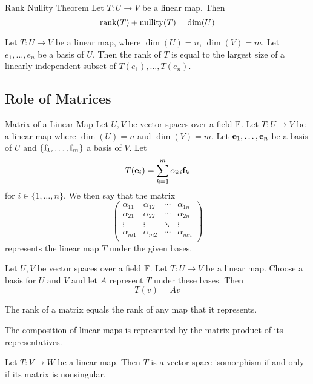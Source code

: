\documentclass[a4paper]{article}
\begin{document}
\begin{thm}{Rank Nullity Theorem}{} Let $T:U\to V$ be a linear map. Then $$\rank(T)+\operatorname{nullity}(T)=\dim(U)$$
\end{thm}

\begin{thm}{}{} Let $T:U\to V$ be a linear map, where $\dim(U)=n$, $\dim(V)=m$. Let $e_1,\dots,e_n$ be a basis of $U$. Then the rank of $T$ is equal to the largest size of a linearly independent subset of $T(e_1),\dots,T(e_n)$. 
\end{thm}

\subsection{Role of Matrices}
\begin{defn}{Matrix of a Linear Map}{} Let $U,V$ be vector spaces over a field $\mathbb{F}$. Let $T:U\to V$ be a linear map where $\dim(U)=n$ and $\dim(V)=m$. Let $\vb{e}_1,\dots,\vb{e}_n$ be a basis of $U$ and $\{\vb{f}_1,\dots,\vb{f}_m\}$ a basis of $V$. Let $$T(\vb{e}_i)=\sum_{k=1}^m\alpha_{ki}\vb{f}_k$$ for $i\in\{1,\dots,n\}$. We then say that the matrix $$\begin{pmatrix}
\alpha_{11} & \alpha_{12} & \cdots & \alpha_{1n}\\
\alpha_{21} & \alpha_{22} & \cdots & \alpha_{2n}\\
\vdots & \vdots & \ddots & \vdots\\
\alpha_{m1} & \alpha_{m2} & \cdots & \alpha_{mn}\\
\end{pmatrix}$$ represents the linear map $T$ under the given bases. 
\end{defn}

\begin{thm}{}{} Let $U,V$ be vector spaces over a field $\mathbb{F}$. Let $T:U\to V$ be a linear map. Choose a basis for $U$ and $V$ and let $A$ represent $T$ under these bases. Then $$T(v)=Av$$
\end{thm}

\begin{thm}{}{} The rank of a matrix equals the rank of any map that it represents. 
\end{thm}

\begin{thm}{}{} The composition of linear maps is represented by the matrix product of its representatives. 
\end{thm}

\begin{thm}{}{} Let $T:V\to W$ be a linear map. Then $T$ is a vector space isomorphism if and only if its matrix is nonsingular. 
\end{thm}
\end{document}
